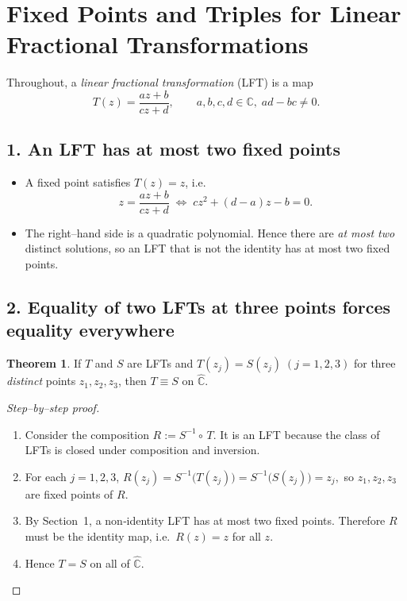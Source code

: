 \documentclass[12pt]{article}
\theoremstyle{definition} %
\newtheorem{theorem}{Theorem}
\theoremstyle{plain} %
\begin{document}
\section*{Fixed Points and Triples for Linear Fractional Transformations}

Throughout, a \emph{linear fractional transformation} (LFT) is a map
\[
   T(z)=\frac{az+b}{cz+d},
   \qquad a,b,c,d\in\mathbb C,\;ad-bc\ne0 .
\]

\subsection*{1.\; An LFT has at most two fixed points}

\begin{itemize}
   \item A fixed point satisfies $T(z)=z$, i.e.
         \[
            z=\frac{az+b}{cz+d}
            \;\Longleftrightarrow\;
            cz^{2}+(d-a)z-b=0.
         \]
   \item The right–hand side is a quadratic polynomial.
         Hence there are \emph{at most two} distinct solutions, so an
         LFT that is not the identity has at most two fixed points.
\end{itemize}

\subsection*{2.\; Equality of two LFTs at three points forces equality everywhere}

\begin{theorem}\label{unique}
If $T$ and $S$ are LFTs and
\(
   T(z_{j})=S(z_{j}) \;(j=1,2,3)
\)
for three \emph{distinct} points $z_{1},z_{2},z_{3}$,
then $T\equiv S$ on $\widehat{\mathbb C}$.
\end{theorem}

\begin{proof}[Step–by–step proof]
\begin{enumerate}
   \item Consider the composition
         \(
            R:=S^{-1}\!\circ\,T.
         \)
         It is an LFT because the class of LFTs is closed under
         composition and inversion.
   \item For each $j=1,2,3$,
         \(
            R(z_{j})=S^{-1}\!\bigl(T(z_{j})\bigr)
                   =S^{-1}\!\bigl(S(z_{j})\bigr)=z_{j},
         \)
         so $z_{1},z_{2},z_{3}$ are fixed points of $R$.
   \item By Section~1, a non‑identity LFT has at most two fixed points.
         Therefore $R$ must be the identity map, i.e.\ $R(z)=z$ for all
         $z$.
   \item Hence $T=S$ on all of $\widehat{\mathbb C}$.
\end{enumerate}
\end{proof}
\end{document}

